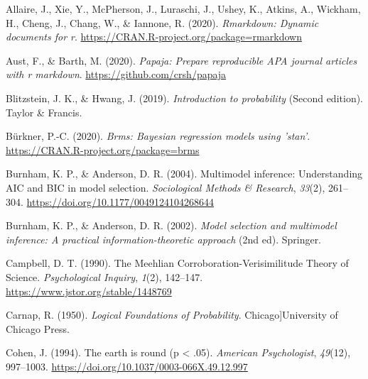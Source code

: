 \documentclass[
  a4paper,11pt,twoside,onecolumn,openright,final,oldfontcommands]{memoir}
\newlength{\cslhangindent}
\newlength{\cslentryspacingunit} %
\newenvironment{CSLReferences}[2] %
 {%
  \setlength{\parindent}{0pt}
  \ifodd #1
  \let\oldpar\par
  \def\par{\hangindent=\cslhangindent\oldpar}
  \fi
  \setlength{\parskip}{#2\cslentryspacingunit}
 }%
 {}
\theoremstyle{definition}
\theoremstyle{definition}
\theoremstyle{definition}
\theoremstyle{definition}
\theoremstyle{remark}
\begin{document}

\setlength{\parindent}{-0.5in}
\setlength{\parskip}{8pt}

\hypertarget{refs}{}
\begin{CSLReferences}{1}{0}
\leavevmode{}%
Allaire, J., Xie, Y., McPherson, J., Luraschi, J., Ushey, K., Atkins, A., Wickham, H., Cheng, J., Chang, W., \& Iannone, R. (2020). \emph{Rmarkdown: Dynamic documents for r}. \url{https://CRAN.R-project.org/package=rmarkdown}

\leavevmode{}%
Aust, F., \& Barth, M. (2020). \emph{Papaja: Prepare reproducible APA journal articles with r markdown}. \url{https://github.com/crsh/papaja}

\leavevmode{}%
Blitzstein, J. K., \& Hwang, J. (2019). \emph{Introduction to probability} (Second edition). Taylor \& Francis.

\leavevmode{}%
Bürkner, P.-C. (2020). \emph{Brms: Bayesian regression models using 'stan'}. \url{https://CRAN.R-project.org/package=brms}

\leavevmode{}%
Burnham, K. P., \& Anderson, D. R. (2004). Multimodel inference: {Understanding} {AIC} and {BIC} in model selection. \emph{Sociological Methods \& Research}, \emph{33}(2), 261--304. \url{https://doi.org/10.1177/0049124104268644}

\leavevmode{}%
Burnham, K. P., \& Anderson, D. R. (2002). \emph{Model selection and multimodel inference: A practical information-theoretic approach} (2nd ed). Springer.

\leavevmode{}%
Campbell, D. T. (1990). The {Meehlian} {Corroboration}-{Verisimilitude} {Theory} of {Science}. \emph{Psychological Inquiry}, \emph{1}(2), 142--147. \url{https://www.jstor.org/stable/1448769}

\leavevmode{}%
Carnap, R. (1950). \emph{Logical {Foundations} of {Probability}}. Chicago{]}University of Chicago Press.

\leavevmode{}%
Cohen, J. (1994). The earth is round (p {\textless{}} .05). \emph{American Psychologist}, \emph{49}(12), 997--1003. \url{https://doi.org/10.1037/0003-066X.49.12.997}


\end{CSLReferences}
\end{document}
